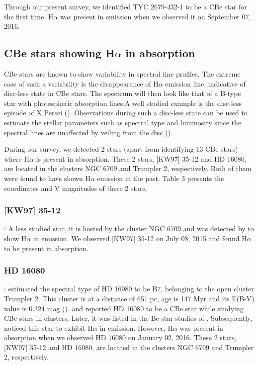 \documentclass{jaa}
\begin{document}
Through our present survey, we identified TYC 2679-432-1 to be a CBe star for the first time. H$\alpha$ was present in emission when we observed it on September 07, 2016. 

\subsection{CBe stars showing H$\alpha$ in absorption}
CBe stars are known to show variability in spectral line profiles. The extreme case of such a variability is the disappearance of H$\alpha$ emission line, indicative of disc-less state in CBe stars. The spectrum will then look like that of a B-type star with photospheric absorption lines.A well studied example is the disc-less episode of X Persei (\citealt{1991Norton, 2013Mathew}). Observations during such a disc-less state can be used to estimate the stellar parameters such as spectral type and luminosity since the spectral lines are unaffected by veiling from the disc (\citealt{1992Fabregat}).

During our survey, we detected 2 stars (apart from identifying 13 CBe stars) where H$\alpha$ is present in absorption. These 2 stars, [KW97] 35-12 and HD 16080, are located in the clusters NGC 6709 and Trumpler 2, respectively. Both of them were found to have shown H$\alpha$ emission in the past. Table 3 presents the coordinates and V magnitudes of these 2 stars.

\subsubsection{[KW97] 35-12}:
A less studied star, it is hosted by the cluster NGC 6709 and was detected by \cite{1997Kohoutek, 1999Kohoutek} to show H$\alpha$ in emission. We observed [KW97] 35-12 on July 08, 2015 and found H$\alpha$ to be present in absorption.

\subsubsection{HD 16080}:
\cite{1965Hoag} estimated the spectral type of HD 16080 to be B7, belonging to the open cluster Trumpler 2. This cluster is at a distance of 651 pc, age is 147 Myr and its E(B-V) value is 0.324 mag (\citealt{1965Hoag}). \cite{1976Schild} and \cite{1978Schild} reported HD 16080 to be a CBe star while studying CBe stars in clusters. Later, it was listed in the Be star studies of \cite{1982Mermilliod}. Subsequently, \cite{1999Kohoutek, 1997Kohoutek} noticed this star to exhibit H$\alpha$ in emission. However, H$\alpha$ was present in absorption when we observed HD 16080 on January 02, 2016. These 2 stars, [KW97] 35-12 and HD 16080, are located in the clusters NGC 6709 and Trumpler 2, respectively. 
\end{document}
